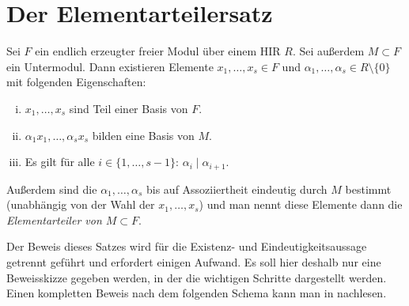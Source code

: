 
\chapter{Der Elementarteilersatz}
\begin{thSatz}[Elementarteilersatz]\label{ets}
    Sei $F$ ein endlich erzeugter freier Modul über einem HIR $R$. Sei außerdem
    $M\subset F$ ein Untermodul. Dann existieren Elemente $x_1,\ldots,x_s\in F$
    und $\alpha_1,\ldots,\alpha_s\in R\setminus\{0\}$ mit folgenden
    Eigenschaften:
    \begin{enumerate}[i)]
        \item
            $x_1,\ldots,x_s$ sind Teil einer Basis von $F$.
        \item
            $\alpha_1 x_1, \ldots, \alpha_s x_s$ bilden eine Basis von $M$.
        \item
            Es gilt für alle $i\in\{1,\ldots,s-1\}$:\; $\alpha_i\mid\alpha_{i+1}$.
    \end{enumerate}
    Außerdem sind die $\alpha_1,\ldots,\alpha_s$ bis auf Assoziiertheit
    eindeutig durch $M$ bestimmt (unabhängig von der Wahl der $x_1,\ldots,x_s$)
    und man nennt diese Elemente dann die \emph{Elementarteiler von 
    $M\subset F$}.
\end{thSatz}

Der Beweis dieses Satzes wird für die Existenz- und Eindeutigkeitsaussage
getrennt geführt und erfordert einigen Aufwand. Es soll hier deshalb nur eine
Beweisskizze gegeben werden, in der die wichtigen Schritte dargestellt werden.
Einen kompletten Beweis nach dem folgenden Schema kann man in 
\cite[S.\,210, Theorem~4~ff.]{bookc:bosch08}
nachlesen.

